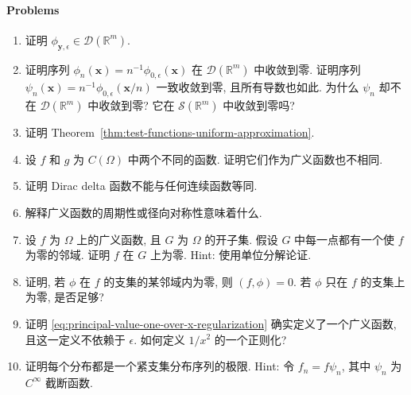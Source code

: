\paragraph*{Problems}

\begin{enumerate}[label=\thesection.\arabic*.,ref=\thesection.\arabic*,start=1,series=book-problems]

\item\label{ex:bump-is-test-function} 证明 $\phi_{\bm{y},\epsilon}\in\mathcal{D}(\mathbb{R}^m)$.

\item\label{ex:test-function-support-escape} 证明序列 $\phi_n(\bm{x})=n^{-1}\phi_{0,\epsilon}(\bm{x})$ 在 $\mathcal{D}(\mathbb{R}^m)$ 中收敛到零. 证明序列 $\psi_n(\bm{x})=n^{-1}\phi_{0,\epsilon}(\bm{x}/n)$ 一致收敛到零, 且所有导数也如此. 为什么 $\psi_n$ 却不在 $\mathcal{D}(\mathbb{R}^m)$ 中收敛到零? 它在 $\mathcal{S}(\mathbb{R}^m)$ 中收敛到零吗?

\item\label{ex:prove-test-function-uniform-approximation} 证明 Theorem~\ref{thm:test-functions-uniform-approximation}.

\item\label{ex:regular-distributions-injective} 设 $f$ 和 $g$ 为 $C(\Omega)$ 中两个不同的函数. 证明它们作为广义函数也不相同.

\item\label{ex:delta-not-continuous-function} 证明 Dirac delta 函数不能与任何连续函数等同.

\item\label{ex:distribution-periodicity-radial-symmetry} 解释广义函数的周期性或径向对称性意味着什么.

\item\label{ex:distribution-local-vanishing} 设 $f$ 为 $\Omega$ 上的广义函数, 且 $G$ 为 $\Omega$ 的开子集. 假设 $G$ 中每一点都有一个使 $f$ 为零的邻域. 证明 $f$ 在 $G$ 上为零. Hint: 使用单位分解论证.

\item\label{ex:pairing-away-from-distribution-support} 证明, 若 $\phi$ 在 $f$ 的支集的某邻域内为零, 则 $(f,\phi)=0$. 若 $\phi$ 只在 $f$ 的支集上为零, 是否足够?

\item\label{ex:principal-value-regularization} 证明 \eqref{eq:principal-value-one-over-x-regularization} 确实定义了一个广义函数, 且这一定义不依赖于 $\epsilon$. 如何定义 $1/x^2$ 的一个正则化?

\item\label{ex:compactly-supported-distribution-density} 证明每个分布都是一个紧支集分布序列的极限. Hint: 令 $f_n=f\psi_n$, 其中 $\psi_n$ 为 $C^\infty$ 截断函数.


\end{enumerate}
